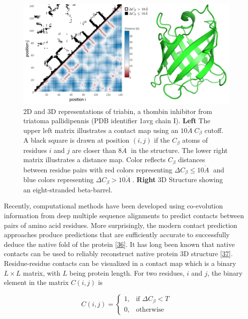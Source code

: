 \documentclass[11pt,a4paper,twoside]{book}
\newcommand{\Cb}{C_\beta}
\newcommand{\angstrom}{\mathring{A} \;}
\theoremstyle{definition}
\theoremstyle{definition}
\theoremstyle{remark}
\begin{document}
\begin{figure}

{\centering \includegraphics[width=1\linewidth]{img/intro/contat_map_and_structure_1avgi00} 

}

\caption{2D and 3D representations of triabin, a
thombin inhibitor from triatoma pallidipennis (PDB identifier 1avg chain
I). \textbf{Left} The upper left matrix illustrates a contact map using
an \(10 \angstrom \Cb\) cutoff. A black square is drawn at position
\((i, j)\) if the \(\Cb\) atoms of residues \(i\) and \(j\) are closer
than \(8 \angstrom\) in the structure. The lower right matrix
illustrates a distance map. Color reflects \(\Cb\) distances between
residue pairs with red colors representing
\(\Delta \Cb \le 10 \angstrom\) and blue colors representing
\(\Delta \Cb > 10 \angstrom\). \textbf{Right} 3D Structure showing an
eight-stranded beta-barrel.}\label{fig:contact-map}
\end{figure}

Recently, computational methods have been developed using co-evolution
information from deep multiple sequence alignments to predict contacts
between pairs of amino acid residues. More surprisingly, the modern
contact prediction approaches produce predictions that are sufficiently
accurate to successfully deduce the native fold of the protein
{[}\protect\hyperlink{ref-Marks2011}{36}{]}. It has long been known that
native contacts can be used to reliably reconstruct native protein 3D
structure {[}\protect\hyperlink{ref-Vendruscolo1997}{37}{]}.
Residue-residue contacts can be visualized in a contact map which is a
binary \(L \times L\) matrix, with \(L\) being protein length. For two
residues, \(i\) and \(j\), the binary element in the matrix \(C(i,j)\)
is

\begin{equation}
    C(i,j) =    
    \begin{cases}
        1, & \text{if } \Delta \Cb < T \\
        0, & \text{otherwise}
    \end{cases}
\end{equation}
\end{document}
